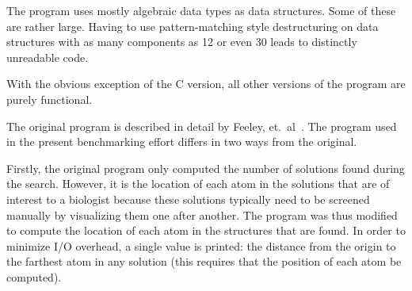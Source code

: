 The program uses mostly algebraic data types as data structures. Some
of these are rather large. Having to use pattern-matching style
destructuring on data structures with as many components as 12 or even
30 leads to distinctly unreadable code.

With the obvious exception of the C version, all other versions of the
program are purely functional.

The original program is described in detail by Feeley, et.\ al~\cite{Fee94}. The
program used in the present benchmarking effort differs in two ways
from the original.

Firstly, the original program only computed the number of solutions
found during the search. However, it is the location of each atom in
the solutions that are of interest to a biologist because these
solutions typically need to be screened manually by visualizing them
one after another. The program was thus modified to compute the
location of each atom in the structures that are found. In order to
minimize I/O overhead, a single value is printed: the distance from
the origin to the farthest atom in any solution (this requires that the
position of each atom be computed).

